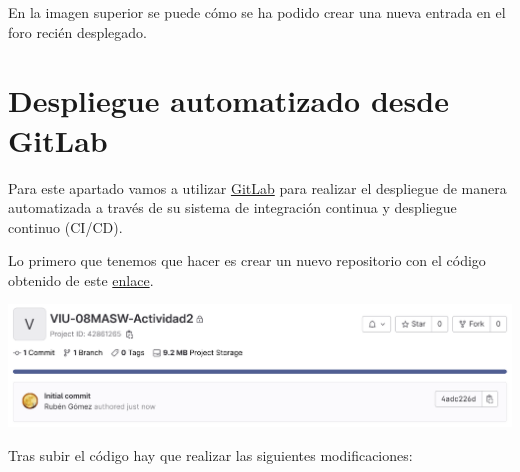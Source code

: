 \documentclass{\ClassPath/viu-tfm-template}
\begin{document}
En la imagen superior se puede cómo se ha podido crear una nueva entrada en el foro recién desplegado.


\chapter{Despliegue automatizado desde GitLab}

Para este apartado vamos a utilizar \href{https://gitlab.com/}{GitLab} para realizar el despliegue de manera automatizada a través de su sistema de integración continua y despliegue continuo (CI/CD).

Lo primero que tenemos que hacer es crear un nuevo repositorio con el código obtenido de este \href{https://amn-viu-resources-public.s3.eu-west-1.amazonaws.com/08masw/actividad2/flarum_php8.0.zip}{enlace}.

\begin{center}
    \includegraphics[frame,width=\linewidth]{img/gitlab.png}
\end{center}

Tras subir el código hay que realizar las siguientes modificaciones:
\end{document}
